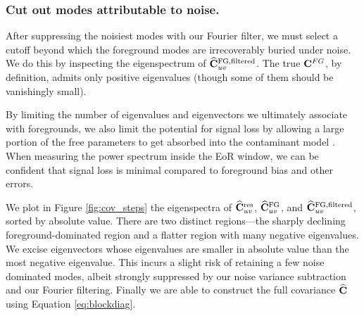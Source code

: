 
\subsubsection{Cut out modes attributable to noise.}

After suppressing the noisiest modes with our Fourier filter, we must select a cutoff beyond which the foreground modes are irrecoverably buried under noise. We do this by inspecting the eigenspectrum of $\widehat{\mathbf{C}}^\text{FG,filtered}_{uv}$. The true $\mathbf{C}^{FG}$, by definition, admits only positive eigenvalues (though some of them should be vanishingly small). 

By limiting the number of eigenvalues and eigenvectors we ultimately associate with foregrounds, we also limit the potential for signal loss by allowing a large portion of the free parameters to get absorbed into the contaminant model \citep{EricAdrianEmpiricalGlobalForegrounds,ali15}. When measuring the power spectrum inside the EoR window, we can be confident that signal loss is minimal compared to foreground bias and other errors.

We plot in Figure \ref{fig:cov_steps} the eigenspectra of $\widehat{\mathbf{C}}_{uv}^\text{res}$, $\widehat{\mathbf{C}}^\text{FG}_{uv}$, and $\widehat{\mathbf{C}}^\text{FG,filtered}_{uv}$, sorted by absolute value. There are two distinct regions---the sharply declining foreground-dominated region and a flatter region with many negative eigenvalues. We excise eigenvectors whose eigenvalues are smaller in absolute value than the most negative eigenvalue. This incurs a slight risk of retaining a few noise dominated modes, albeit strongly suppressed by our noise variance subtraction and our Fourier filtering. Finally we are able to construct the full covariance $\widehat{\mathbf{C}}$ using Equation \eqref{eq:blockdiag}.

